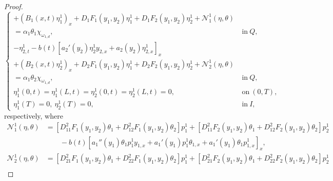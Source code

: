 \documentclass[11pt,a4paper]{amsart}
\numberwithin{equation}{section}
\begin{document}
\begin{proof}
\begin{equation}
\begin{cases}
             + \left(B_1(x,t) \eta^1_1\right)_x
            + D_1 F_1(y_1,y_2)\eta_1^1 + D_1 F_2(y_1,y_2)\eta_2^1 +\mathcal{N}_1^1(\eta,\theta) \\
             =\alpha_1\theta_1\chi_{\omega_{1,d}}, &\ \text{in} \ {Q},\\
			-\eta^1_{2,t} 
            - b(t) \left[ a_2'(y_2)\eta^1_2 y_{2,x} + a_2(y_2) \eta^1_{2,x}\right]_x \\
            + \left(B_2(x,t) \eta^1_2\right)_x
            + D_2 F_1(y_1,y_2)\eta_1^1 + D_2 F_2(y_1,y_2)\eta_2^1 + \mathcal{N}_2^1(\eta,\theta) \\
            =\alpha_1\theta_2\chi_{\omega_{1,d}}, &\ \text{in} \ {Q},\\
			\eta^{1}_1(0,t)=\eta^{1}_1(L,t)=\eta^{1}_2(0,t)=\eta^{1}_2(L,t)=0, & \ \text{on} \  {(0,T)},\\
			\eta^{1}_1(T)=0, \ \eta^{1}_2(T)=0, & \ \text{in} \ I,
		\end{cases}
	\end{equation}respectively,  where
    \begin{equation}\label{N_1N_2masnafren}
        \begin{split}
			\mathcal{N}_1^1(\eta,\theta) &=[D_{11}^2 F_1(y_1,y_2)\theta_1+D_{12}^2 F_1(y_1,y_2)\theta_2]p_1^1
			+[D_{11}^2 F_2(y_1,y_2)\theta_1+D_{12}^2 F_2(y_1,y_2)\theta_2]p_2^1 \\
            &\qquad -b(t) \left[ a_1''(y_{1})\theta_1 p^1_1 y_{1,x} + a_1'(y_{1})p^1_1 \theta_{1,x} + a_1'(y_1) \theta_1 p^1_{1,x} \right]_x, \\
            \mathcal{N}_2^1(\eta,\theta) &= [D_{21}^2 F_1(y_1,y_2)\theta_1+D_{22}^2 F_1(y_1,y_2)\theta_2]p_1^1
            +[D_{21}^2 F_2(y_1,y_2)\theta_1+D_{22}^2 F_2(y_1,y_2)\theta_2]p_2^1 \\

\end{split}
\end{equation}
\end{proof}
\end{document}
